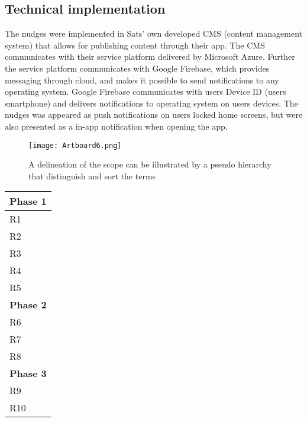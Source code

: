 \subsection{Technical implementation}
The nudges were implemented in Sats' own developed CMS (content management system) that allows for publishing content through their app. The CMS communicates with their service platform delivered by Microsoft Azure. Further the service platform communicates with Google Firebase, which provides messaging through cloud, and makes it possible to send notifications to any operating system. Google Firebase communicates with users Device ID (users smartphone) and delivers notifications to operating system on users devices. The nudges was appeared as push notifications on users locked home screens, but were also presented as a in-app notification when opening the app. 
\bigbreak
\bigbreak
\begin{figure}[h]
\texttt{[image: Artboard6.png]}
\caption{A delineation of the scope can be illustrated by a pseudo hierarchy that distinguish and sort the terms}
\end{figure}
\bigbreak
\bigbreak


\begin{table}[ht]
\begin{tabular}{|l|l|}
\hline
\multicolumn{2}{|l|}{\textbf{Phase 1}} \\ \hline
R1 &  \\ \hline
R2 &  \\ \hline
R3 &  \\ \hline
R4 &  \\ \hline
R5 &  \\ \hline
\multicolumn{2}{|l|}{\textbf{Phase 2}} \\ \hline
R6 &  \\ \hline
R7 &  \\ \hline
R8 &  \\ \hline
\multicolumn{2}{|l|}{\textbf{Phase 3}} \\ \hline
R9 &  \\ \hline
R10 &  \\ \hline
\end{tabular}
\end{table}

\begin{comment}
\end{comment}

